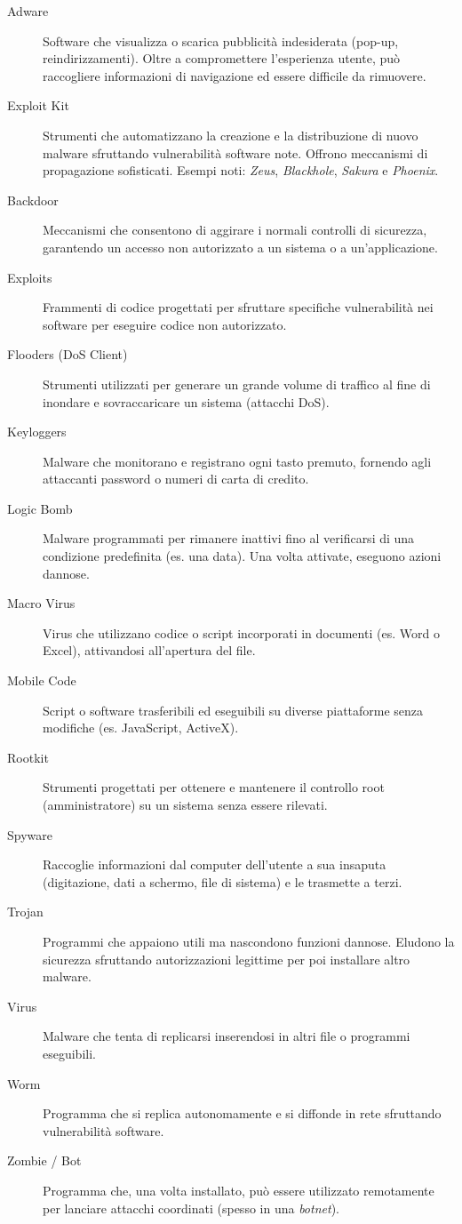 \begin{defbox}
\begin{description}
    \item[Adware] Software che visualizza o scarica pubblicità indesiderata (pop-up, reindirizzamenti). Oltre a compromettere l'esperienza utente, può raccogliere informazioni di navigazione ed essere difficile da rimuovere.
    \item[Exploit Kit] Strumenti che automatizzano la creazione e la distribuzione di nuovo malware sfruttando vulnerabilità software note. Offrono meccanismi di propagazione sofisticati. Esempi noti: \textit{Zeus}, \textit{Blackhole}, \textit{Sakura} e \textit{Phoenix}.
    \item[Backdoor] Meccanismi che consentono di aggirare i normali controlli di sicurezza, garantendo un accesso non autorizzato a un sistema o a un'applicazione.
    \item[Exploits] Frammenti di codice progettati per sfruttare specifiche vulnerabilità nei software per eseguire codice non autorizzato.
    \item[Flooders (DoS Client)] Strumenti utilizzati per generare un grande volume di traffico al fine di inondare e sovraccaricare un sistema (attacchi DoS).
    \item[Keyloggers] Malware che monitorano e registrano ogni tasto premuto, fornendo agli attaccanti password o numeri di carta di credito.
    \item[Logic Bomb] Malware programmati per rimanere inattivi fino al verificarsi di una condizione predefinita (es. una data). Una volta attivate, eseguono azioni dannose.
    \item[Macro Virus] Virus che utilizzano codice o script incorporati in documenti (es. Word o Excel), attivandosi all'apertura del file.
    \item[Mobile Code] Script o software trasferibili ed eseguibili su diverse piattaforme senza modifiche (es. JavaScript, ActiveX).
    \item[Rootkit] Strumenti progettati per ottenere e mantenere il controllo root (amministratore) su un sistema senza essere rilevati.
    \item[Spyware] Raccoglie informazioni dal computer dell'utente a sua insaputa (digitazione, dati a schermo, file di sistema) e le trasmette a terzi.
    \item[Trojan] Programmi che appaiono utili ma nascondono funzioni dannose. Eludono la sicurezza sfruttando autorizzazioni legittime per poi installare altro malware.
    \item[Virus] Malware che tenta di replicarsi inserendosi in altri file o programmi eseguibili.
    \item[Worm] Programma che si replica autonomamente e si diffonde in rete sfruttando vulnerabilità software.
    \item[Zombie / Bot] Programma che, una volta installato, può essere utilizzato remotamente per lanciare attacchi coordinati (spesso in una \textit{botnet}).
\end{description}
\end{defbox}


